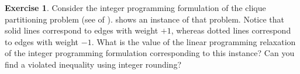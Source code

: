 \documentclass[titlepage]{book}
\theoremstyle{plain}
\theoremstyle{definition}
\newtheorem{exercise}{Exercise}[chapter]
\theoremstyle{remark}
\begin{document}
\begin{exercise}
Consider the integer programming formulation of the clique partitioning problem (see  of ).  shows an instance of that problem. Notice that solid lines correspond to edges with weight $+1$, whereas dotted lines correspond to edges with weight $-1$. What is the value of the linear programming relaxation of the integer programming formulation corresponding to this instance? Can you find a violated inequality using integer rounding?
\end{exercise}



\printindex
\glsaddall
{}
\printglossaries
\end{document}
